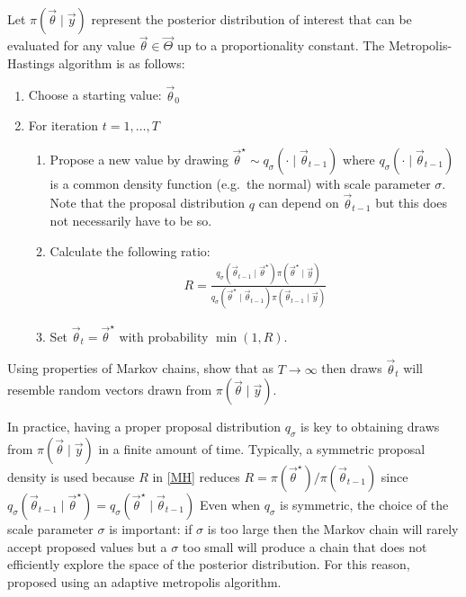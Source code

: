 Let $\pi(\vec{\theta}\mid \vec{y})$ represent the posterior distribution of interest that can be evaluated for any value $\vec{\theta} \in \vec{\Theta}$ up to a proportionality constant. The Metropolis-Hastings algorithm is as follows: 
\begin{enumerate}
\item Choose a starting value: $\vec{\theta}_0$
\item For iteration $t=1,\dots,T$
\begin{enumerate}
\item Propose a new value by drawing $\vec{\theta}^\star \sim q_\sigma(\cdot\mid\vec{\theta}_{t-1})$ where $q_\sigma(\cdot\mid \vec{\theta}_{t-1})$ is a common density function (e.g.\ the normal) with scale parameter $\sigma$.  Note that the proposal distribution $q$ can depend on $\vec{\theta}_{t-1}$ but this does not necessarily have to be so.
\item Calculate the following ratio: 
\begin{align}
R = \frac{q_\sigma(\vec{\theta}_{t-1}\mid \vec{\theta}^\star)\pi(\vec{\theta}^\star\mid \vec{y})}{q_\sigma(\vec{\theta}^\star\mid \vec{\theta}_{t-1})\pi(\vec{\theta}_{t-1}\mid \vec{y})} 
\label{MH}
\end{align}
\item Set $\vec{\theta}_{t} = \vec{\theta}^\star$ with probability $\min(1,R)$.
\end{enumerate}
\end{enumerate}
Using properties of Markov chains, \citet{metropolis53} show that as $T\rightarrow \infty$ then draws $\vec{\theta}_{t}$ will resemble random vectors drawn from $\pi(\vec{\theta}\mid\vec{y})$.

In practice, having a proper proposal distribution $q_\sigma$ is key to obtaining draws from $\pi(\vec{\theta}\mid\vec{y})$ in a finite amount of time. Typically, a symmetric proposal density is used because  $R$ in \eqref{MH} reduces $ R = \pi(\vec{\theta}^\star)/\pi(\vec{\theta}_{t-1})$ since  $q_\sigma(\vec{\theta}_{t-1}\mid \vec{\theta}^\star) = q_\sigma(\vec{\theta}^\star\mid \vec{\theta}_{t-1})$  Even when $q_\sigma$ is symmetric, the choice of the scale parameter $\sigma$ is important: if $\sigma$ is too large then the Markov chain will rarely accept proposed values but a $\sigma$ too small will produce a chain that does not efficiently explore the space of the posterior distribution. For this reason, \citet{haario01} proposed using an adaptive metropolis algorithm.


